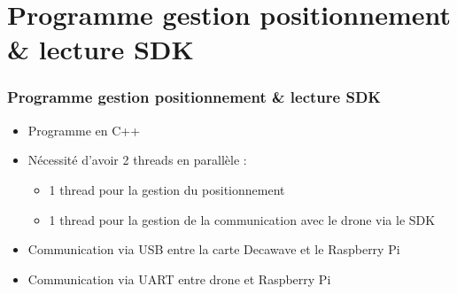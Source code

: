 \documentclass[12pt]{beamer}
\begin{document}
	\section{Programme gestion positionnement \& lecture SDK}	
	\begin{frame}[allowframebreaks]
    	\frametitle{Programme gestion positionnement \& lecture SDK}
    	    \begin{exampleblock}{}
        	    \begin{itemize}
        	        [triangle]
        	        \item Programme en C++
        	        \item Nécessité d'avoir 2 threads en parallèle :
        	            \begin{itemize}
        	                [circle]
        	                \item 1 thread pour la gestion du positionnement
        	                \item 1 thread pour la gestion de la communication avec le drone via le SDK
        	            \end{itemize}
        	        \item Communication via USB entre la carte Decawave et le Raspberry Pi
        	        \item Communication via UART entre drone et Raspberry Pi
        	    \end{itemize}
    	    \end{exampleblock}
	\end{frame}
\end{document}
